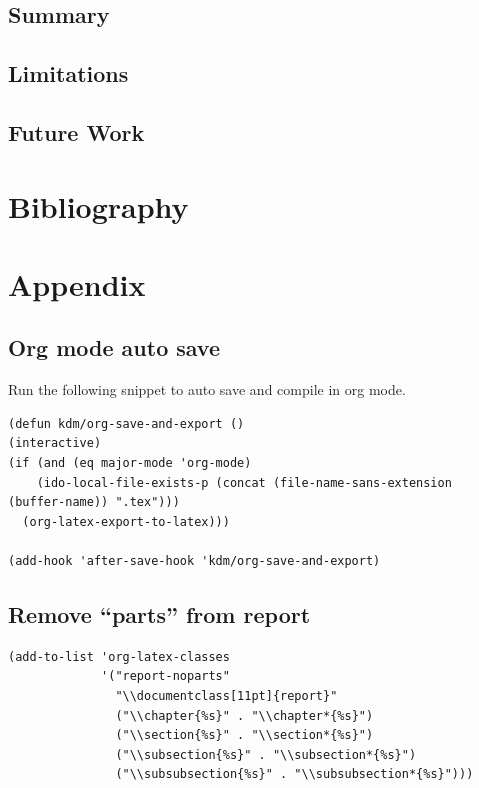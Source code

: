 \documentclass[letterpaper, 12pt]{report}
\begin{document}
\section{Summary}
\label{sec:org06f6c51}
\section{Limitations}
\label{sec:org338fd40}
\section{Future Work}
\label{sec:org67bf752}
\clearpage
\chapter{Bibliography}
\label{sec:org49a30b2}




\printglossaries

\chapter{Appendix}
\label{sec:orgfe900d8}
\section{Org mode auto save}
\label{sec:org9aa068f}
Run the following snippet to auto save and compile in org mode.

\begin{verbatim}
(defun kdm/org-save-and-export ()
(interactive)
(if (and (eq major-mode 'org-mode)
    (ido-local-file-exists-p (concat (file-name-sans-extension (buffer-name)) ".tex")))
  (org-latex-export-to-latex)))

(add-hook 'after-save-hook 'kdm/org-save-and-export)
\end{verbatim}

\section{Remove ``parts'' from report}
\label{sec:org9b6eddf}

\begin{verbatim}
(add-to-list 'org-latex-classes
             '("report-noparts"
               "\\documentclass[11pt]{report}"
               ("\\chapter{%s}" . "\\chapter*{%s}")
               ("\\section{%s}" . "\\section*{%s}")
               ("\\subsection{%s}" . "\\subsection*{%s}")
               ("\\subsubsection{%s}" . "\\subsubsection*{%s}")))
\end{verbatim}
\end{document}
